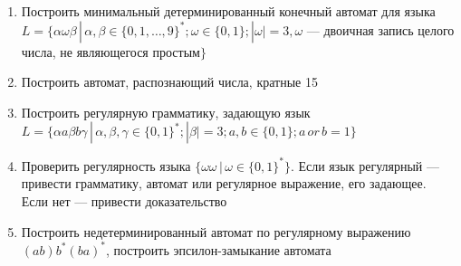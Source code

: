 \documentclass[12pt]{article}
\begin{document}
\begin{enumerate}
  \item Построить минимальный детерминированный конечный автомат для языка \\ $L = \{ \alpha \omega \beta \, | \, \alpha, \beta \in \{ 0, 1, \dots, 9 \}^*; \omega \in \{ 0, 1 \}; |\omega| = 3, \omega$ --- двоичная запись целого числа, не являющегося простым$\}$
  \item { 
         Построить автомат, распознающий числа, кратные 15}
    \item Построить регулярную грамматику, задающую язык \\ $L = \{ \alpha a \beta b \gamma \, | \, \alpha, \beta, \gamma \in \{ 0, 1 \}^*; |\beta| = 3; a, b \in \{ 0, 1 \}; a \, or \, b = 1 \} $
    \item Проверить регулярность языка $\{ \omega \omega \, | \, \omega \in \{0, 1\}^* \}$. Если язык регулярный --- привести грамматику, автомат или регулярное выражение, его задающее. Если нет --- привести доказательство
    \item {Построить недетерминированный автомат по регулярному выражению $ (ab)b^*(ba)^*  $, построить эпсилон-замыкание автомата }
\end{enumerate}
\end{document}
